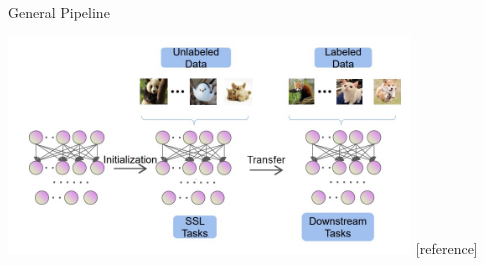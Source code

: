 \documentclass[serif, aspectratio=169]{beamer}
\begin{document}
\begin{frame}[t]{General Pipeline}
    
\begin{center}
	\includegraphics[width=0.8\textwidth]{pic/SSL-pipline.jpg} %
	[reference]
\end{center}

\end{frame}





%        

\end{document}

